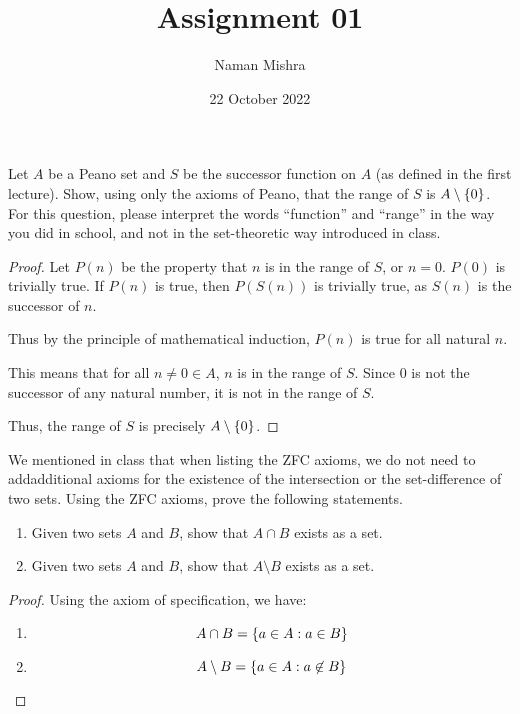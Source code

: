 \documentclass[12pt]{article}
\title{Assignment 01}
\author{Naman Mishra}
\date{22 October 2022}
\begin{document}
\maketitle

\begin{problem}
    Let $A$ be a Peano set and $S$ be the successor function on $A$ (as defined in the first lecture).
    Show, using only the axioms of Peano, that the range of $S$ is $A \setminus \set{0}$.
    For this question, please interpret the words ``function'' and ``range'' in the way you did in school, and not in the set-theoretic way introduced in class.
\end{problem}
\begin{proof}
    Let $P(n)$ be the property that $n$ is in the range of $S$, or $n = 0$.
    $P(0)$ is trivially true.
    If $P(n)$ is true, then $P(S(n))$ is trivially true, as $S(n)$ is the successor of $n$.

    Thus by the principle of mathematical induction, $P(n)$ is true for all natural $n$.
    
    This means that for all $n \neq 0 \in A$, $n$ is in the range of $S$.
    Since $0$ is not the successor of any natural number, it is not in the range of $S$.

    Thus, the range of $S$ is precisely $A \setminus \set{0}$.
\end{proof}

\begin{problem}
    We mentioned in class that when listing the ZFC axioms, we do not need to addadditional axioms for the existence of the intersection or the set-difference of two sets.
    Using the ZFC axioms, prove the following statements.
    \begin{enumerate}[label=(\alph*)]
        \item Given two sets $A$ and $B$, show that $A \cap B$ exists as a set.
        \item Given two sets $A$ and $B$, show that $A \setminus B$ exists as a set.
    \end{enumerate}
\end{problem}

\begin{proof}
    Using the axiom of specification, we have:
    \begin{enumerate}[label=(\alph*)]
        \item \[
            A \cap B = \set{a \in A : a \in B}
        \]
        \item \[
            A \setminus B = \set{a \in A : a \not\in B} \qedhere
        \]
    \end{enumerate}
\end{proof}
\end{document}
